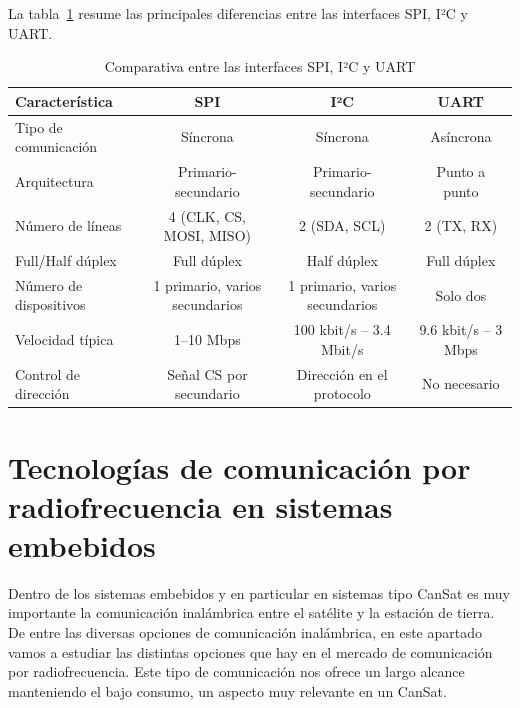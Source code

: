La tabla~\ref{tab:comparativa_interfaces} resume las principales diferencias entre las interfaces SPI, I²C y UART.

\begin{table}[h]
    \centering
    \footnotesize
    \renewcommand{\arraystretch}{1.1}
    \begin{tabular}{|l|c|c|c|}
        \hline
        \textbf{Característica} & \textbf{SPI}               & \textbf{I²C}               & \textbf{UART}       \\
        \hline
        Tipo de comunicación    & Síncrona                   & Síncrona                   & Asíncrona           \\
        \hline
        Arquitectura            & Primario-secundario            & Primario-secundario            & Punto a punto       \\
        \hline
        Número de líneas        & 4 (CLK, CS, MOSI, MISO)    & 2 (SDA, SCL)               & 2 (TX, RX)          \\
        \hline
        Full/Half dúplex        & Full dúplex                & Half dúplex                & Full dúplex         \\
        \hline
        Número de dispositivos  & 1 primario, varios secundarios & 1 primario, varios secundarios & Solo dos            \\
        \hline
        Velocidad típica        & 1–10 Mbps                  & 100 kbit/s – 3.4 Mbit/s    & 9.6 kbit/s – 3 Mbps \\
        \hline
        Control de dirección    & Señal CS por secundario       & Dirección en el protocolo  & No necesario        \\
        \hline
    \end{tabular}
    \caption{Comparativa entre las interfaces SPI, I²C y UART}
    \label{tab:comparativa_interfaces}
\end{table}


\section{Tecnologías de comunicación por radiofrecuencia en sistemas embebidos}
Dentro de los sistemas embebidos y en particular en sistemas tipo CanSat es muy importante la comunicación inalámbrica entre el satélite y la estación de tierra.
De entre las diversas opciones de comunicación inalámbrica, en este apartado vamos a estudiar las distintas opciones que hay en el mercado de comunicación por radiofrecuencia.
Este tipo de comunicación nos ofrece un largo alcance manteniendo el bajo consumo, un aspecto muy relevante en un CanSat.

